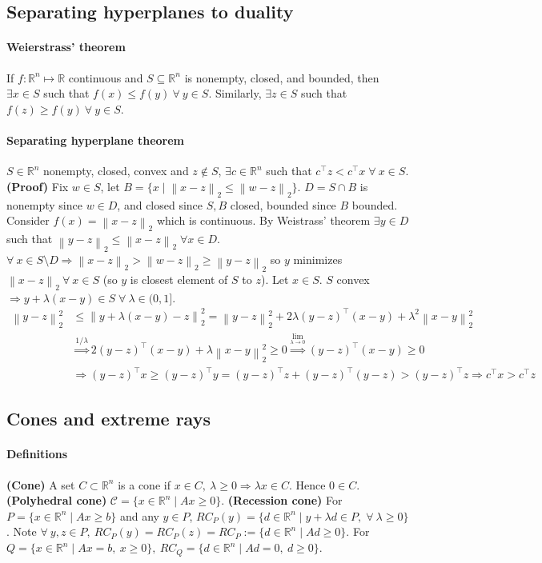 \documentclass{article}
\newcommand{\norm}[2]{\left\lVert#1\right\rVert_#2}
\begin{document}
\subsection{Separating hyperplanes to duality}
\paragraph{Weierstrass' theorem} If $f:\mathbb R^n \mapsto \mathbb R$ continuous and $S\subseteq \mathbb R^n$ is nonempty, closed, and bounded, then $\exists x \in S$ such that $f(x)\leq f(y)\ \forall\ y \in S$. Similarly, $\exists z \in S$ such that $f(z)\geq f(y)\ \forall\ y \in S$. 
\paragraph{Separating hyperplane theorem} $S \in \mathbb R^n$ nonempty, closed, convex and $z \notin S$, $\exists c \in \mathbb R^n$ such that $c^\top z < c^\top x \;\forall\ x \in S$. \textbf{(Proof)} Fix $w \in S$, let $B = \{x\mid \norm{x - z}{2} \leq \norm{w - z}{2}\}$. $D = S \cap B$ is nonempty since $w\in D$, and closed since $S,B$ closed, bounded since $B$ bounded. Consider $f(x) = \norm{x - z}{2}$ which is continuous. By Weistrass' theorem $\exists y\in D$ such that $\norm{y - z}{2} \leq \norm{x - z}{2}\; \forall x \in D$. $\forall\ x \in S\setminus D \Rightarrow \norm{x - z}{2} > \norm{w - z}{2}\geq \norm{y - z}{2}$ so $y$ minimizes $\norm{x - z}{2}\ \forall\ x\in S$ (so $y$ is closest element of $S$ to $z$). Let $x \in S$. $S$ convex $\Rightarrow y + \lambda(x - y) \in S\; \forall\ \lambda \in (0, 1]$. 
\begin{align*}
    \norm{y - z}{2}^2 &\leq \norm{y + \lambda (x - y) - z}{2}^2 = \norm{y - z}{2}^2 + 2\lambda(y - z)^\top (x - y) + \lambda^2\norm{x - y}{2}^2\\
     &\overset{1/\lambda}{\Longrightarrow} 2(y-z)^\top (x - y) + \lambda\norm{x - y}{2}^2 \geq 0 \overset{\lim_{\lambda \rightarrow 0}}{\Longrightarrow} (y-z)^\top (x - y)\geq 0\\
     &\Longrightarrow (y - z)^\top x \geq (y - z)^\top y = (y-z)^\top z + (y - z)^\top (y-z) > (y-z)^\top z \Longrightarrow c^\top x > c^\top z \tag{$c = y - z$}
\end{align*}



\subsection{Cones and extreme rays}
\paragraph{Definitions}\textbf{(Cone)} A set $C\subset\mathbb R^n$ is a cone if $x\in C,\ \lambda\ge 0 \Rightarrow \lambda x \in C$. Hence $0\in C.$
\textbf{(Polyhedral cone)} $\mathcal C = \{x\in \mathbb R^n \mid Ax \geq 0\}$.
\textbf{(Recession cone)} For $P = \{x\in \mathbb R^n\mid Ax \geq b\}$ and any $y\in P$,  $RC_P(y) = \{d \in \mathbb R^n \mid y + \lambda d \in P,\;\forall\ \lambda \geq 0\}$. Note $\forall\ y,z\in P,\ RC_P(y) = RC_P(z) = RC_P := \{d\in \mathbb R^n\mid Ad \geq 0\}$. For $Q = \{x\in \mathbb R^n\mid Ax = b,\ x\geq 0\},\ RC_Q = \{d\in \mathbb R^n \mid Ad = 0,\ d\geq 0\}$. 
\end{document}
